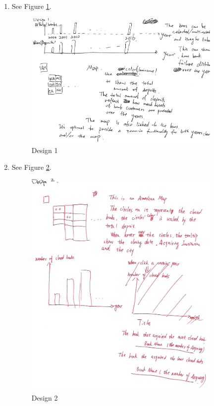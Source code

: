 \documentclass[11pt]{article}
\begin{document}
\begin{enumerate}
    \item See Figure \ref{fig:design_1}.

        \begin{figure}[!h]
            \centering
            \includegraphics[width=0.9\textwidth]{fig/design_1}
            \caption{Design 1}
            \label{fig:design_1}
        \end{figure}

    \item See Figure \ref{fig:design_2}.

        \begin{figure}[!h]
            \centering
            \includegraphics[width=0.9\textwidth]{fig/design_2}
            \caption{Design 2}
            \label{fig:design_2}
        \end{figure}


\end{enumerate}
\end{document}
